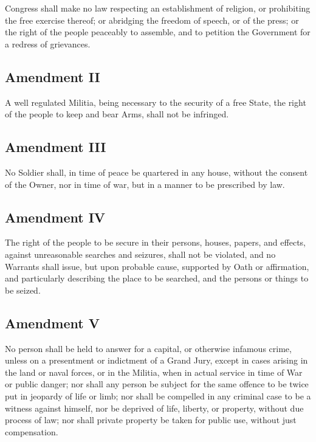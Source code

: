 \documentclass[11pt,a4paper]{article}
\begin{document}
Congress shall make no law respecting an establishment of religion, or prohibiting the free exercise thereof; or abridging the freedom of speech, or of the press; or the right of the people peaceably to assemble, and to petition the Government for a redress of grievances.

\subsection*{Amendment II}

A well regulated Militia, being necessary to the security of a free State, the right of the people to keep and bear Arms, shall not be infringed.

\subsection*{Amendment III}

No Soldier shall, in time of peace be quartered in any house, without the consent of the Owner, nor in time of war, but in a manner to be prescribed by law.

\subsection*{Amendment IV}

The right of the people to be secure in their persons, houses, papers, and effects, against unreasonable searches and seizures, shall not be violated, and no Warrants shall issue, but upon probable cause, supported by Oath or affirmation, and particularly describing the place to be searched, and the persons or things to be seized.

\subsection*{Amendment V}

No person shall be held to answer for a capital, or otherwise infamous crime, unless on a presentment or indictment of a Grand Jury, except in cases arising in the land or naval forces, or in the Militia, when in actual service in time of War or public danger; nor shall any person be subject for the same offence to be twice put in jeopardy of life or limb; nor shall be compelled in any criminal case to be a witness against himself, nor be deprived of life, liberty, or property, without due process of law; nor shall private property be taken for public use, without just compensation.
\end{document}
